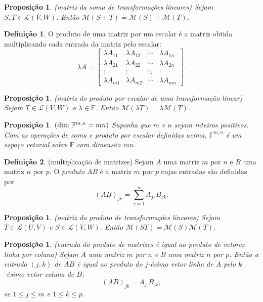 \documentclass[12pt]{article}
\theoremstyle{plain}
\newtheorem{prop}[thm]{Proposição}
\theoremstyle{definition}
\newtheorem{defn}{Definição}[section]
\theoremstyle{remark}
\begin{document}
\begin{prop} (matriz da soma de transformações lineares)
    Sejam \(S, T \in \mathcal{L}(V, W)\). Então \(\mathcal{M}(S + T) = \mathcal{M}(S) + \mathcal{M}(T)\).
\end{prop}

\begin{defn}
    O produto de uma matriz por um escalar é a matriz obtida multiplicando cada entrada da matriz pelo escalar:
    \[
        \lambda A = \begin{bmatrix}
            \lambda A_{11} & \lambda A_{12} & \cdots & \lambda A_{1n} \\
            \lambda A_{21} & \lambda A_{22} & \cdots & \lambda A_{2n} \\
            \vdots & \vdots & \ddots & \vdots \\
            \lambda A_{m1} & \lambda A_{m2} & \cdots & \lambda A_{mn}
        \end{bmatrix}.
    \]
\end{defn}

\begin{prop} (matriz do produto por escalar de uma transformação linear)
    Sejam \(T \in \mathcal{L}(V, W)\) e \(\lambda \in \mathbb{F}\). Então \(\mathcal{M}(\lambda T) = \lambda \mathcal{M}(T)\).
\end{prop}

\begin{prop} \((\textup{dim } \mathbb{F}^{m,n} = mn)\)
    Suponha que \(m\) e \(n\) sejam inteiros positivos. Com as operações de soma e produto por escalar definidas acima, \(\mathbb{F}^{m,n}\) é um espaço vetorial sobre \(\mathbb{F}\) com dimensão \(mn\).    
\end{prop}

\begin{defn} (multiplicação de matrizes)
    Sejam \(A\) uma matriz \(m\) por \(n\) e \(B\) uma matriz \(n\) por \(p\). O \emph{produto} \(AB\) é a matriz \(m\) por \(p\) cujas entradas são definidas por
    \[
        (AB)_{jk} = \sum_{r=1}^{n} A_{jr} B_{rk}.
    \]
\end{defn}

\begin{prop} (matriz do produto de transformações lineares)
    Sejam \(T \in \mathcal{L}(U, V)\) e \(S \in \mathcal{L}(V, W)\). Então \(\mathcal{M}(ST) = \mathcal{M}(S) \mathcal{M}(T)\).
\end{prop}

\begin{prop} (entrada do produto de matrizes é igual ao produto de vetores linha por coluna)
    Sejam \(A\) uma matriz \(m\) por \(n\) e \(B\) uma matriz \(n\) por \(p\). Então a entrada \((j, k)\) de \(AB\) é igual ao produto do \(j\)-ésimo vetor linha de \(A\) pelo \(k\)-ésimo vetor coluna de \(B\):
    \[
        (AB)_{jk} = A_{j.} B_{.k},
    \]
    \noindent se \(1 \leq j \leq m\) e \(1 \leq k \leq p\).
\end{prop}
\end{document}
